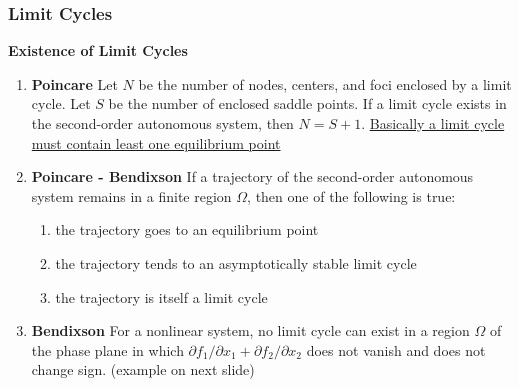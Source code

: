 \documentclass[11pt,handout]{beamer}   %
\begin{document}
\begin{frame}
\frametitle{Limit Cycles}
\small
\textbf{Existence of Limit Cycles}\\

\begin{enumerate}
\item \textbf{Poincare} Let $N$ be the number of nodes, centers, and foci enclosed by a limit cycle. Let $S$ be the number of enclosed saddle points. If a limit cycle exists in the second-order autonomous system, then $N=S+1$. \underline{Basically a limit cycle must contain least one equilibrium point}
\item \textbf{Poincare - Bendixson} If a trajectory of the second-order autonomous system remains in a finite region $\Omega$, then one of the following is true:
\begin{enumerate}
\item the trajectory goes to an equilibrium point
\item the trajectory tends to an asymptotically stable limit cycle
\item the trajectory is itself a limit cycle
\end{enumerate}
\item \textbf{Bendixson} For a nonlinear system, no limit cycle can exist in a region $\Omega$ of the phase plane in which $\partial f_1 / \partial x_1 + \partial f_2 / \partial x_2$ does not vanish and does not change sign. (example on next slide)
\end{enumerate}
\end{frame}
\end{document}
